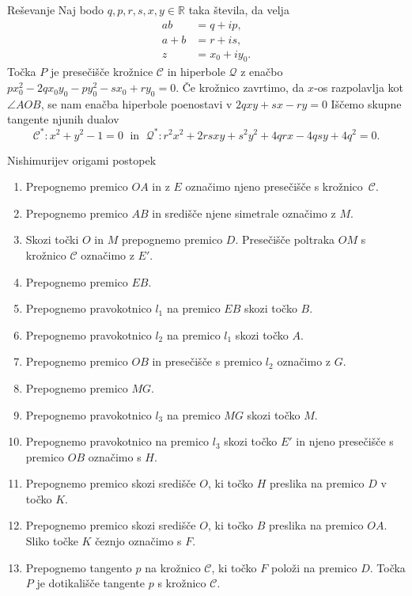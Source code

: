 \documentclass{beamer}
\begin{document}

\begin{frame}{Reševanje}
    Naj bodo $q, p, r, s, x, y \in \mathbb{R}$ taka števila, da velja
    \begin{align*}
        ab &= q + i p, \\
        a + b &= r + i s, \\
        z &= x_0 + i y_0.
    \end{align*}
    Točka $P$ je presečišče krožnice $\mathcal{C}$ in hiperbole $\mathcal{Q}$ z enačbo $px_0^2 -2qx_0y_0 -py_0^2 - sx_0 + ry_0 = 0$.
    Če krožnico zavrtimo, da $x$-os razpolavlja kot $\angle AOB$, se nam enačba hiperbole poenostavi v $2qxy + sx - ry = 0$
    Iščemo skupne tangente njunih dualov
    $$ \mathcal{C^*}: x^2 + y^2 - 1 = 0 \; \text{ in } \; \mathcal{Q^*}: r^2x^2 + 2rsxy + s^2y^2 + 4qrx - 4qsy + 4q^2 = 0. $$
\end{frame}


\begin{frame}{Nishimurijev origami postopek}
    \begin{enumerate}
        \item Prepognemo premico $OA$ in z $E$ označimo njeno presečišče s krožnico~$\mathcal{C}$.
        \item Prepognemo premico $AB$ in središče njene simetrale označimo z $M$.
        \item Skozi točki $O$ in $M$ prepognemo premico $D$. Presečišče poltraka $OM$ s krožnico $\mathcal{C}$ označimo z $E'$.
        \item Prepognemo premico $EB$.
        \item Prepognemo pravokotnico $l_1$ na premico $EB$ skozi točko $B$.
        \item Prepognemo pravokotnico $l_2$ na premico $l_1$ skozi točko $A$.
        \item Prepognemo premico $OB$ in presečišče s premico $l_2$ označimo z $G$.
        \item Prepognemo premico $MG$.
        \item Prepognemo pravokotnico $l_3$ na premico $MG$ skozi točko $M$.
        \item Prepognemo pravokotnico na premico $l_3$ skozi točko $E'$ in njeno presečišče s premico $OB$ označimo s $H$.
        \item Prepognemo premico skozi središče $O$, ki točko $H$ preslika na premico $D$ v točko $K$.
        \item Prepognemo premico skozi središče $O$, ki točko $B$ preslika na premico $OA$. Sliko točke $K$ čeznjo označimo s $F$.        
        \item Prepognemo tangento $p$ na krožnico $\mathcal{C}$, ki točko $F$ položi na premico $D$. Točka $P$ je dotikališče tangente $p$ s krožnico $\mathcal{C}$.
    \end{enumerate}
\end{frame}
\end{document}
